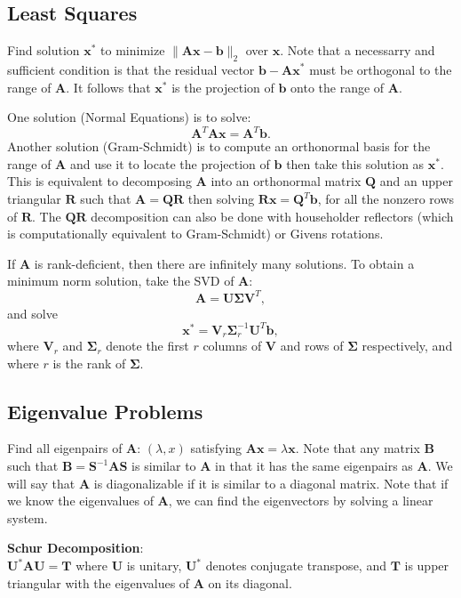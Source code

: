 \documentclass[12pt]{article}
\begin{document}
\subsection*{Least Squares}

Find solution $\mathbf{x}^*$ to minimize $\|\mathbf{Ax} - \mathbf{b}\|_2$ over 
$\mathbf{x}$.
Note that a necessarry and sufficient condition is that the residual vector
$\mathbf{b} - \mathbf{Ax}^*$ must be orthogonal to the range of $\mathbf{A}$.
It follows that $\mathbf{x}^*$ is the projection of $\mathbf{b}$ onto the
range of $\mathbf{A}$.

One solution (Normal Equations) is to solve:
$$\mathbf{A}^T\mathbf{Ax} = \mathbf{A}^T\mathbf{b}.$$
Another solution (Gram-Schmidt) is to compute an orthonormal basis for the
range of $\mathbf{A}$ and use it to locate the projection of $\mathbf{b}$
then take this solution as $\mathbf{x}^*$.
This is equivalent to decomposing $\mathbf{A}$ into an orthonormal matrix
$\mathbf{Q}$ and an upper triangular $\mathbf{R}$ such that
$\mathbf{A} = \mathbf{QR}$ then solving $\mathbf{Rx} = \mathbf{Q}^T\mathbf{b}$,
for all the nonzero rows of $\mathbf{R}$.
The $\mathbf{QR}$ decomposition can also be done with householder reflectors
(which is computationally equivalent to Gram-Schmidt) or Givens rotations.

If $\mathbf{A}$ is rank-deficient, then there are infinitely many solutions.
To obtain a minimum norm solution, take the SVD of $\mathbf{A}$:
$$\mathbf{A} = \mathbf{U\Sigma V}^T,$$
and solve
$$\mathbf{x}^* = \mathbf{V}_r\mathbf{\Sigma}_r^{-1}\mathbf{U}^T\mathbf{b},$$
where $\mathbf{V}_r$ and $\mathbf{\Sigma}_r$ denote the first $r$ columns of
$\mathbf{V}$ and rows of $\mathbf{\Sigma}$ respectively, and where $r$ is the 
rank of $\mathbf{\Sigma}$.

\subsection*{Eigenvalue Problems}

Find all eigenpairs of $\mathbf{A}$: $(\lambda, x)$ satisfying 
$\mathbf{Ax} = \lambda\mathbf{x}$.
Note that any matrix $\mathbf{B}$ such that 
$\mathbf{B}=\mathbf{S}^{-1}\mathbf{AS}$ is similar to $\mathbf{A}$ in that it
has the same eigenpairs as $\mathbf{A}$.
We will say that $\mathbf{A}$ is diagonalizable if it is similar to a diagonal
matrix.
Note that if we know the eigenvalues of $\mathbf{A}$, we can find the 
eigenvectors by solving a linear system.

\textbf{Schur Decomposition}:\\
$\mathbf{U}^*\mathbf{AU} = \mathbf{T}$ where $\mathbf{U}$ is unitary, 
$\mathbf{U}^*$ denotes conjugate transpose, and $\mathbf{T}$ is upper triangular
with the eigenvalues of $\mathbf{A}$ on its diagonal.
\end{document}
